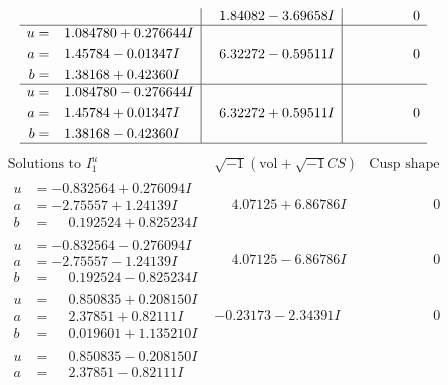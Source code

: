 \documentclass[1p]{elsarticle_modified}
\theoremstyle{definition}
\newcommand{\I}{\sqrt{-1}}
\begin{document}
$$\begin{array}{c|c|c}
 & \phantom{-}1.84082 - 3.69658 I & \phantom{-0.000000 } 0 \\ \hline\begin{aligned}
u &= \phantom{-}1.084780 + 0.276644 I \\
a &= \phantom{-}1.45784 - 0.01347 I \\
b &= \phantom{-}1.38168 + 0.42360 I\end{aligned}
 & \phantom{-}6.32272 - 0.59511 I & \phantom{-0.000000 } 0 \\ \hline\begin{aligned}
u &= \phantom{-}1.084780 - 0.276644 I \\
a &= \phantom{-}1.45784 + 0.01347 I \\
b &= \phantom{-}1.38168 - 0.42360 I\end{aligned}
 & \phantom{-}6.32272 + 0.59511 I & \phantom{-0.000000 } 0\\
 \hline 
 \end{array}$$\newpage$$\begin{array}{c|c|c}  
\text{Solutions to }I^u_{1}& \I (\text{vol} + \sqrt{-1}CS) & \text{Cusp shape}\\
 \hline 
\begin{aligned}
u &= -0.832564 + 0.276094 I \\
a &= -2.75557 + 1.24139 I \\
b &= \phantom{-}0.192524 + 0.825234 I\end{aligned}
 & \phantom{-}4.07125 + 6.86786 I & \phantom{-0.000000 } 0 \\ \hline\begin{aligned}
u &= -0.832564 - 0.276094 I \\
a &= -2.75557 - 1.24139 I \\
b &= \phantom{-}0.192524 - 0.825234 I\end{aligned}
 & \phantom{-}4.07125 - 6.86786 I & \phantom{-0.000000 } 0 \\ \hline\begin{aligned}
u &= \phantom{-}0.850835 + 0.208150 I \\
a &= \phantom{-}2.37851 + 0.82111 I \\
b &= \phantom{-}0.019601 + 1.135210 I\end{aligned}
 & -0.23173 - 2.34391 I & \phantom{-0.000000 } 0 \\ \hline\begin{aligned}
u &= \phantom{-}0.850835 - 0.208150 I \\
a &= \phantom{-}2.37851 - 0.82111 I \\

\end{aligned}
\end{array}$$
\end{document}
